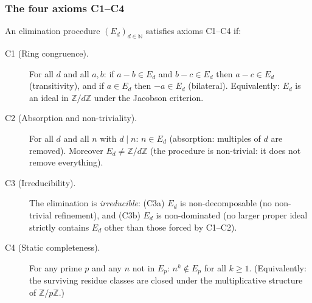 \documentclass[12pt,a4paper]{article}
\begin{document}
\subsubsection{The four axioms C1--C4}
\label{subsec:C1_C4}

\begin{definition}
\label{def:C1_C4}
An elimination procedure $(E_d)_{d \in \mathbb{N}}$ satisfies axioms
C1--C4 if:

\begin{description}
\item[C1 (Ring congruence).] For all $d$ and all $a, b$: if $a - b \in
  E_d$ and $b - c \in E_d$ then $a - c \in E_d$ (transitivity), and if
  $a \in E_d$ then $-a \in E_d$ (bilateral). Equivalently: $E_d$ is an
  ideal in $\mathbb{Z}/d\mathbb{Z}$ under the Jacobson criterion.

\item[C2 (Absorption and non-triviality).] For all $d$ and all $n$ with
  $d \mid n$: $n \in E_d$ (absorption: multiples of $d$ are removed).
  Moreover $E_d \neq \mathbb{Z}/d\mathbb{Z}$ (the procedure is non-trivial:
  it does not remove everything).

\item[C3 (Irreducibility).] The elimination is \emph{irreducible}: (C3a) $E_d$
  is non-decomposable (no non-trivial refinement), and (C3b) $E_d$ is
  non-dominated (no larger proper ideal strictly contains $E_d$ other than
  those forced by C1--C2).

\item[C4 (Static completeness).] For any prime $p$ and any $n$ not in $E_p$:
  $n^k \notin E_p$ for all $k \geq 1$. (Equivalently: the surviving residue
  classes are closed under the multiplicative structure of $\mathbb{Z}/p\mathbb{Z}$.)
\end{description}
\end{definition}
\end{document}
